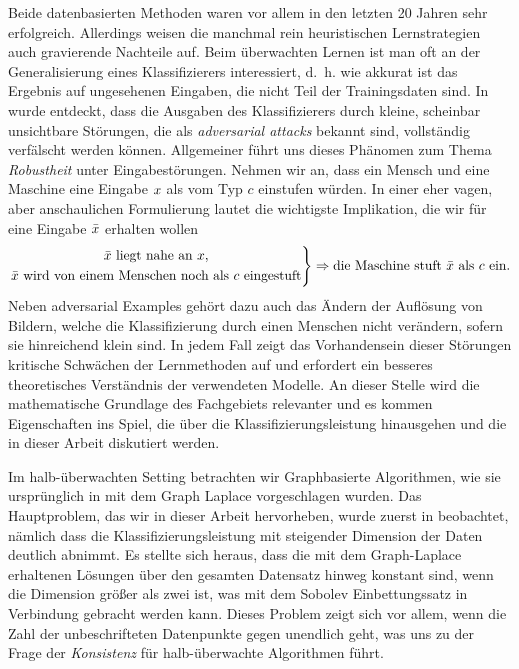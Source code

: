 Beide datenbasierten Methoden waren vor allem in den letzten 20 Jahren sehr erfolgreich. Allerdings weisen die manchmal rein heuristischen Lernstrategien auch gravierende Nachteile auf. Beim überwachten Lernen ist man oft an der Generalisierung eines Klassifizierers interessiert, d.~h. wie akkurat ist das Ergebnis auf ungesehenen Eingaben, die nicht Teil der Trainingsdaten sind. In \cite{goodfellow2014explaining} wurde entdeckt, dass die Ausgaben des Klassifizierers durch kleine, scheinbar unsichtbare Störungen, die als \textit{adversarial attacks} bekannt sind, vollständig verfälscht werden können. Allgemeiner führt uns dieses Phänomen zum Thema \textit{Robustheit} unter Eingabestörungen. Nehmen wir an, dass ein Mensch und eine Maschine eine Eingabe $x$ als vom Typ $c$ einstufen würden. In einer eher vagen, aber anschaulichen Formulierung lautet die wichtigste Implikation, die wir für eine Eingabe $\bar{x}$ erhalten wollen
%
\begin{align*}
\left.
\begin{gathered}
\bar{x}\text{ liegt nahe an }x,\\
\bar{x}\text{ wird von einem Menschen noch als }c\text{ eingestuft}
\end{gathered}
\right\}
\Rightarrow
\text{die Maschine stuft }\bar{x}\text{ als }c  \text{ ein.} 
\end{align*}
%
Neben adversarial Examples gehört dazu auch das Ändern der Auflösung von Bildern, welche die Klassifizierung durch einen Menschen nicht verändern, sofern sie hinreichend klein sind. In jedem Fall zeigt das Vorhandensein dieser Störungen kritische Schwächen der Lernmethoden auf und erfordert ein besseres theoretisches Verständnis der verwendeten Modelle. An dieser Stelle wird die mathematische Grundlage des Fachgebiets relevanter und es kommen Eigenschaften ins Spiel, die über die Klassifizierungsleistung hinausgehen und die in dieser Arbeit diskutiert werden.

Im halb-überwachten Setting betrachten wir Graphbasierte Algorithmen, wie sie ursprünglich in \cite{zhu2003semi} mit dem Graph Laplace vorgeschlagen wurden. Das Hauptproblem, das wir in dieser Arbeit hervorheben, wurde zuerst in \cite{nadler2009statistical} beobachtet, nämlich dass die Klassifizierungsleistung mit steigender Dimension der Daten deutlich abnimmt. Es stellte sich heraus, dass die mit dem Graph-Laplace erhaltenen Lösungen über den gesamten Datensatz hinweg konstant sind, wenn die Dimension größer als zwei ist, was mit dem Sobolev Einbettungssatz \cite{adams2003sobolev} in Verbindung gebracht werden kann. Dieses Problem zeigt sich vor allem, wenn die Zahl der unbeschrifteten Datenpunkte gegen unendlich geht, was uns zu der Frage der \textit{Konsistenz} für halb-überwachte Algorithmen führt.

